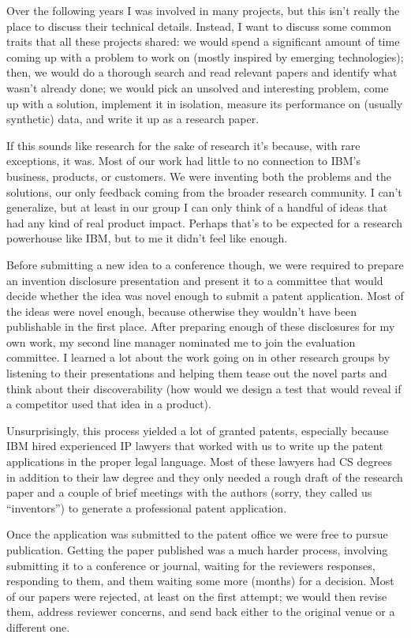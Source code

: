\documentclass[12pt]{book}
\begin{document}
Over the following years I was involved in many projects, but this isn't
really the place to discuss their technical details. Instead, I want to
discuss some common traits that all these projects shared: we would
spend a significant amount of time coming up with a problem to work on
(mostly inspired by emerging technologies); then, we would do a thorough
search and read relevant papers and identify what wasn't already done;
we would pick an unsolved and interesting problem, come up with a
solution, implement it in isolation, measure its performance on (usually
synthetic) data, and write it up as a research paper.

If this sounds like research for the sake of research it's because, with
rare exceptions, it was. Most of our work had little to no connection to
IBM's business, products, or customers. We were inventing both the
problems and the solutions, our only feedback coming from the broader
research community. I can't generalize, but at least in our group I can
only think of a handful of ideas that had any kind of real product
impact. Perhaps that's to be expected for a research powerhouse like
IBM, but to me it didn't feel like enough.

Before submitting a new idea to a conference though, we were required to
prepare an invention disclosure presentation and present it to a
committee that would decide whether the idea was novel enough to submit
a patent application. Most of the ideas were novel enough, because
otherwise they wouldn't have been publishable in the first place. After
preparing enough of these disclosures for my own work, my second line
manager nominated me to join the evaluation committee. I learned a lot
about the work going on in other research groups by listening to their
presentations and helping them tease out the novel parts and think about
their discoverability (how would we design a test that would reveal if a
competitor used that idea in a product).

Unsurprisingly, this process yielded a lot of granted patents,
especially because IBM hired experienced IP lawyers that worked with us
to write up the patent applications in the proper legal language. Most
of these lawyers had CS degrees in addition to their law degree and they
only needed a rough draft of the research paper and a couple of brief
meetings with the authors (sorry, they called us ``inventors'') to
generate a professional patent application.

Once the application was submitted to the patent office we were free to
pursue publication. Getting the paper published was a much harder
process, involving submitting it to a conference or journal, waiting for
the reviewers responses, responding to them, and them waiting some more
(months) for a decision. Most of our papers were rejected, at least on
the first attempt; we would then revise them, address reviewer concerns,
and send back either to the original venue or a different one.
\end{document}
